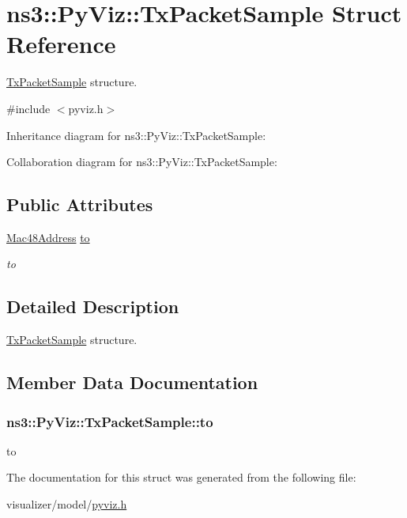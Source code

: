 \hypertarget{structns3_1_1PyViz_1_1TxPacketSample}{}\section{ns3\+:\+:Py\+Viz\+:\+:Tx\+Packet\+Sample Struct Reference}
\label{structns3_1_1PyViz_1_1TxPacketSample}


\hyperlink{structns3_1_1PyViz_1_1TxPacketSample}{Tx\+Packet\+Sample} structure.  




{\ttfamily \#include $<$pyviz.\+h$>$}



Inheritance diagram for ns3\+:\+:Py\+Viz\+:\+:Tx\+Packet\+Sample\+:


Collaboration diagram for ns3\+:\+:Py\+Viz\+:\+:Tx\+Packet\+Sample\+:
\subsection*{Public Attributes}
\begin{DoxyCompactItemize}
\item 
\hyperlink{classns3_1_1Mac48Address}{Mac48\+Address} \hyperlink{structns3_1_1PyViz_1_1TxPacketSample_abf058d6d9cb0091bbb91a1c801b3aef7}{to}
\begin{DoxyCompactList}\small\item\em to \end{DoxyCompactList}\end{DoxyCompactItemize}


\subsection{Detailed Description}
\hyperlink{structns3_1_1PyViz_1_1TxPacketSample}{Tx\+Packet\+Sample} structure. 

\subsection{Member Data Documentation}
\subsubsection[{\texorpdfstring{to}{to}}]{ ns3\+::\+Py\+Viz\+::\+Tx\+Packet\+Sample\+::to}\hypertarget{structns3_1_1PyViz_1_1TxPacketSample_abf058d6d9cb0091bbb91a1c801b3aef7}{}\label{structns3_1_1PyViz_1_1TxPacketSample_abf058d6d9cb0091bbb91a1c801b3aef7}


to 



The documentation for this struct was generated from the following file\+:\begin{DoxyCompactItemize}
\item 
visualizer/model/\hyperlink{pyviz_8h}{pyviz.\+h}\end{DoxyCompactItemize}
